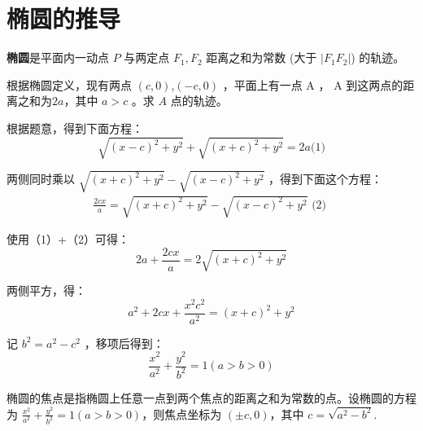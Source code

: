 \section{椭圆的推导}

\begin{definition}[第一定义]
    \textbf{椭圆}是平面内一动点 $P$ 与两定点 $F_1, F_2$ 距离之和为常数 (大于 $|F_1F_2|$) 的轨迹。
\end{definition}

\begin{theorem}[椭圆方程的推导过程]
    根据椭圆定义，现有两点 $(c, 0)$,$(-c, 0)$ ，平面上有一点 A ， A 到这两点的距离之和为$2a$，其中 $a>c$ 。求 $A$ 点的轨迹。

    根据题意，得到下面方程：
    $$
        \sqrt{(x-c)^2+y^2}+\sqrt{(x+c)^2+y^2}=2 a \text{(1)}
    $$

    两侧同时乘以 $\sqrt{(x+c)^2+y^2}-\sqrt{(x-c)^2+y^2}$ ，得到下面这个方程：
    $$
        \begin{aligned}
            \frac{2 c x}{a}=\sqrt{(x+c)^2+y^2}-\sqrt{(x-c)^2+y^2} \text { (2) }
        \end{aligned}
    $$

    使用（1）+（2）可得：
    $$
        2 a+\frac{2 c x}{a}=2 \sqrt{(x+c)^2+y^2}
    $$

    两侧平方，得：
    $$
        a^2+2 c x+\frac{x^2 c^2}{a^2}=(x+c)^2+y^2
    $$

    记 $b^2=a^2-c^2$ ，移项后得到：
    $$
        \frac{x^2}{a^2}+\frac{y^2}{b^2}=1(a>b>0)
    $$
\end{theorem}

\begin{definition}[椭圆的焦点]
    椭圆的焦点是指椭圆上任意一点到两个焦点的距离之和为常数的点。设椭圆的方程为 $\frac{x^2}{a^2}+\frac{y^2}{b^2}=1(a>b>0)$，则焦点坐标为 $(\pm c, 0)$，其中 $c=\sqrt{a^2-b^2}$.
\end{definition}

